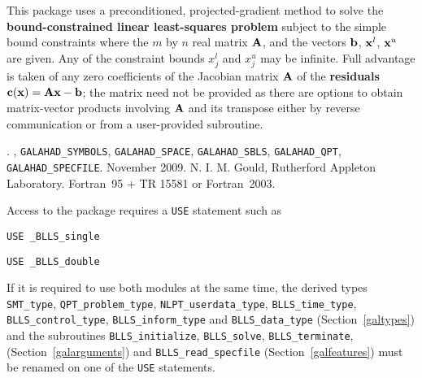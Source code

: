 \documentclass{galahad}
\newcommand{\packagename}{BLLS}
\newcommand{\fullpackagename}{\libraryname\_\packagename}
\begin{document}
\galheader


\galsummary
This package uses a preconditioned, projected-gradient method
to solve the {\bf bound-constrained linear least-squares problem}
subject to the simple bound constraints
where the $m$ by $n$ real matrix ${\mathbf{A}}$, and the
vectors ${\mathbf{b}}$, ${\mathbf{x}}^{l}$, ${\mathbf{x}}^{u}$ are given.
Any of the constraint bounds $x_{j}^{l}$ and $x_{j}^{u}$ may be infinite.
Full advantage is taken of any zero coefficients of the Jacobian matrix ${\mathbf{A}}$
of the {\bf residuals} ${\mathbf{c}}({\mathbf{x}}) = {\mathbf{A}} {\mathbf{x}} - {\mathbf{b}}$;
the matrix need not be provided as there are options to obtain matrix-vector
products involving ${\mathbf{A}}$ and its transpose either by reverse communication
or from a user-provided subroutine.


\galattributes
\galversions{\tt  \fullpackagename\_single, \fullpackagename\_double}.
,
{\tt GALAHAD\_SY\-M\-BOLS},
{\tt GALAHAD\-\_\-SPACE},
{\tt GALAHAD\_SBLS},
{\tt GALAHAD\_QPT},
{\tt GALAHAD\_SPECFILE}.
\galdate November 2009.
\galorigin N. I. M. Gould, Rutherford Appleton Laboratory.
\gallanguage Fortran~95 + TR 15581 or Fortran~2003.


\galhowto


Access to the package requires a {\tt USE} statement such as

\medskip{}

\hspace{8mm} {\tt USE \fullpackagename\_single}

\medskip{}

\hspace{8mm} {\tt USE  \fullpackagename\_double}

\medskip

\noindent
If it is required to use both modules at the same time, the derived types
{\tt SMT\_type},
{\tt QPT\_problem\_type},
{\tt NLPT\_userdata\-\_type},
{\tt \packagename\_time\_type},
{\tt \packagename\_control\_type},
{\tt \packagename\_inform\_type}
and
{\tt \packagename\_data\_type}
(Section~\ref{galtypes})
and the subroutines
{\tt \packagename\_initialize},
{\tt \packagename\_\-solve},
{\tt \packagename\_terminate},
(Section~\ref{galarguments})
and
{\tt \packagename\_read\_specfile}
(Section~\ref{galfeatures})
must be renamed on one of the {\tt USE} statements.
\end{document}
